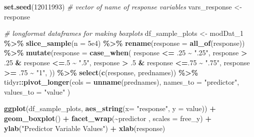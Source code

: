 \documentclass[
]{article}
\newenvironment{Shaded}{\begin{snugshade}}{\end{snugshade}}
\newcommand{\AttributeTok}[1]{\textcolor[rgb]{0.13,0.29,0.53}{#1}}
\newcommand{\CommentTok}[1]{\textcolor[rgb]{0.56,0.35,0.01}{\textit{#1}}}
\newcommand{\DecValTok}[1]{\textcolor[rgb]{0.00,0.00,0.81}{#1}}
\newcommand{\FloatTok}[1]{\textcolor[rgb]{0.00,0.00,0.81}{#1}}
\newcommand{\FunctionTok}[1]{\textcolor[rgb]{0.13,0.29,0.53}{\textbf{#1}}}
\newcommand{\NormalTok}[1]{#1}
\newcommand{\OtherTok}[1]{\textcolor[rgb]{0.56,0.35,0.01}{#1}}
\newcommand{\SpecialCharTok}[1]{\textcolor[rgb]{0.81,0.36,0.00}{\textbf{#1}}}
\newcommand{\StringTok}[1]{\textcolor[rgb]{0.31,0.60,0.02}{#1}}
\begin{document}
\begin{Shaded}
\begin{Highlighting}[]
\FunctionTok{set.seed}\NormalTok{(}\DecValTok{12011993}\NormalTok{)}
\CommentTok{\# vector of name of response variables}
\NormalTok{vars\_response }\OtherTok{\textless{}{-}}\NormalTok{ response}

\CommentTok{\# longformat dataframes for making boxplots}
\NormalTok{df\_sample\_plots }\OtherTok{\textless{}{-}}\NormalTok{  modDat\_1  }\SpecialCharTok{\%\textgreater{}\%} 
  \FunctionTok{slice\_sample}\NormalTok{(}\AttributeTok{n =} \FloatTok{5e4}\NormalTok{) }\SpecialCharTok{\%\textgreater{}\%} 
   \FunctionTok{rename}\NormalTok{(}\AttributeTok{response =} \FunctionTok{all\_of}\NormalTok{(response)) }\SpecialCharTok{\%\textgreater{}\%} 
  \FunctionTok{mutate}\NormalTok{(}\AttributeTok{response =} \FunctionTok{case\_when}\NormalTok{(}
\NormalTok{    response }\SpecialCharTok{\textless{}=}\NormalTok{ .}\DecValTok{25} \SpecialCharTok{\textasciitilde{}} \StringTok{".25"}\NormalTok{, }
\NormalTok{    response }\SpecialCharTok{\textgreater{}}\NormalTok{ .}\DecValTok{25} \SpecialCharTok{\&}\NormalTok{ response }\SpecialCharTok{\textless{}=}\NormalTok{.}\DecValTok{5} \SpecialCharTok{\textasciitilde{}} \StringTok{".5"}\NormalTok{, }
\NormalTok{    response }\SpecialCharTok{\textgreater{}}\NormalTok{ .}\DecValTok{5} \SpecialCharTok{\&}\NormalTok{ response }\SpecialCharTok{\textless{}=}\NormalTok{.}\DecValTok{75} \SpecialCharTok{\textasciitilde{}} \StringTok{".75"}\NormalTok{, }
\NormalTok{    response }\SpecialCharTok{\textgreater{}=}\NormalTok{ .}\DecValTok{75}  \SpecialCharTok{\textasciitilde{}} \StringTok{"1"}\NormalTok{, }
\NormalTok{  )) }\SpecialCharTok{\%\textgreater{}\%} 
  \FunctionTok{select}\NormalTok{(}\FunctionTok{c}\NormalTok{(response, prednames)) }\SpecialCharTok{\%\textgreater{}\%} 
\NormalTok{  tidyr}\SpecialCharTok{::}\FunctionTok{pivot\_longer}\NormalTok{(}\AttributeTok{cols =} \FunctionTok{unname}\NormalTok{(prednames), }
               \AttributeTok{names\_to =} \StringTok{"predictor"}\NormalTok{, }
               \AttributeTok{values\_to =} \StringTok{"value"}
\NormalTok{               )  }
 

  \FunctionTok{ggplot}\NormalTok{(df\_sample\_plots, }\FunctionTok{aes\_string}\NormalTok{(}\AttributeTok{x=} \StringTok{"response"}\NormalTok{, }\AttributeTok{y =} \StringTok{\textquotesingle{}value\textquotesingle{}}\NormalTok{)) }\SpecialCharTok{+}
  \FunctionTok{geom\_boxplot}\NormalTok{() }\SpecialCharTok{+}
  \FunctionTok{facet\_wrap}\NormalTok{(}\SpecialCharTok{\textasciitilde{}}\NormalTok{predictor , }\AttributeTok{scales =} \StringTok{\textquotesingle{}free\_y\textquotesingle{}}\NormalTok{) }\SpecialCharTok{+} 
  \FunctionTok{ylab}\NormalTok{(}\StringTok{"Predictor Variable Values"}\NormalTok{) }\SpecialCharTok{+} 
    \FunctionTok{xlab}\NormalTok{(response)}
\end{Highlighting}
\end{Shaded}
\end{document}
